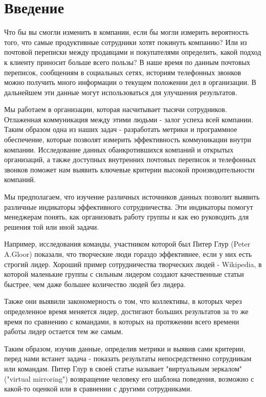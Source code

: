 
\section{Введение}

Что бы вы смогли изменить в компании, если бы могли измерить вероятность того, что самые продуктивные сотрудники хотят покинуть компанию? 
Или из почтовой переписки между продавцами и покупателями определить, какой подход к клиенту приносит больше всего пользы?
В наше время по данным почтовых переписок, сообщениям в социальных сетях, историям телефонных звонков можно получить много информации о текущем положении дел в организации. 
В дальнейшем эти данные могут использоваться для улучшения результатов.

Мы работаем в организации, которая насчитывает тысячи сотрудников. Отлаженная коммуникация между этими людьми - залог успеха всей компании. 
Таким образом одна из наших задач - разработать метрики и программное обеспечение, которые позволят измерить эффективность коммуникации внутри компании. 
Исследование данных обанкротившихся компаний и открытых организаций, а также доступных внутренних почтовых переписок и телефонных звонков поможет нам выявить ключевые критерии высокой производительности компаний. 

Мы предполагаем, что изучение различных источников данных позволит выявить различные индикаторы эффективного сотрудничества. 
Эти индикаторы помогут менеджерам понять, как организовать работу группы и как ею руководить для решения той или иной задачи.

Например, исследования команды, участником которой был Питер Глур (Peter A.Gloor) \cite[p.~9]{peter_gloor_2016} показали, что творческие люди гораздо эффективнее, если у них есть строгий лидер. Хороший пример сотрудничества творческих людей - Wikipedia, в которой маленькие группы с сильным лидером создают качественные статьи быстрее, чем даже большее количество людей без лидера.

Также они выявили закономерность о том, что коллективы, в которых через определенное время меняется лидер, достигают больших результатов за то же время по сравнению с командами, в которых на протяжении всего времени работы лидер остается тем же самым.

Таким образом, изучив данные, определив метрики и выявив сами критерии, перед нами встанет задача - показать результаты непосредственно сотрудникам или командам. Питер Глур в своей статье называет "виртуальным зеркалом" ("virtual mirroring"\cite[p.~10]{peter_gloor_2016}) возвращение человеку его шаблона поведения,  возможно с какой-то оценкой или в сравнении с другими сотрудниками.

